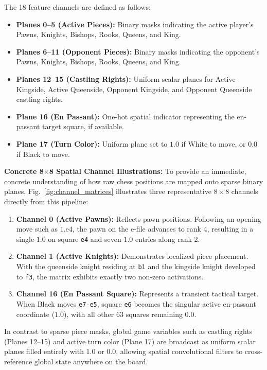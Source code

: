 \documentclass[10pt,journal,compsoc]{IEEEtran}
\begin{document}
The 18 feature channels are defined as follows:
\begin{itemize}
    \item \textbf{Planes 0--5 (Active Pieces):} Binary masks indicating the active player's Pawns, Knights, Bishops, Rooks, Queens, and King.
    \item \textbf{Planes 6--11 (Opponent Pieces):} Binary masks indicating the opponent's Pawns, Knights, Bishops, Rooks, Queens, and King.
    \item \textbf{Planes 12--15 (Castling Rights):} Uniform scalar planes for Active Kingside, Active Queenside, Opponent Kingside, and Opponent Queenside castling rights.
    \item \textbf{Plane 16 (En Passant):} One-hot spatial indicator representing the en-passant target square, if available.
    \item \textbf{Plane 17 (Turn Color):} Uniform plane set to $1.0$ if White to move, or $0.0$ if Black to move.
\end{itemize}

\textbf{Concrete 8$\times$8 Spatial Channel Illustrations:}
To provide an immediate, concrete understanding of how raw chess positions are mapped onto sparse binary planes, Fig.~\ref{fig:channel_matrices} illustrates three representative $8 \times 8$ channels directly from this pipeline:
\begin{enumerate}
    \item \textbf{Channel 0 (Active Pawns):} Reflects pawn positions. Following an opening move such as $1.\text{e4}$, the pawn on the e-file advances to rank 4, resulting in a single $1.0$ on square \texttt{e4} and seven $1.0$ entries along rank 2.
    \item \textbf{Channel 1 (Active Knights):} Demonstrates localized piece placement. With the queenside knight residing at \texttt{b1} and the kingside knight developed to \texttt{f3}, the matrix exhibits exactly two non-zero activations.
    \item \textbf{Channel 16 (En Passant Square):} Represents a transient tactical target. When Black moves \texttt{e7-e5}, square \texttt{e6} becomes the singular active en-passant coordinate ($1.0$), with all other 63 squares remaining $0.0$.
\end{enumerate}
In contrast to sparse piece masks, global game variables such as castling rights (Planes 12--15) and active turn color (Plane 17) are broadcast as uniform scalar planes filled entirely with $1.0$ or $0.0$, allowing spatial convolutional filters to cross-reference global state anywhere on the board.
\end{document}
